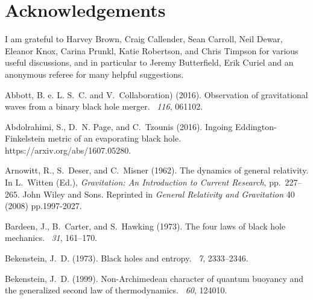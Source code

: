 \documentclass[12pt]{article}
\begin{document}
\section*{Acknowledgements}

I am grateful to Harvey Brown, Craig Callender, Sean Carroll, Neil Dewar, Eleanor Knox, Carina Prunkl, Katie Robertson, and Chris Timpson for various useful discussions, and in particular to Jeremy Butterfield, Erik Curiel and an anonymous referee for many helpful suggestions.


%
%

\begin{thebibliography}{}

\raggedright

Abbott, B. e. L. S.~C. and V.~Collaboration) (2016).
\newblock Observation of gravitational waves from a binary black hole merger.
~{\em 116}, 061102.

Abdolrahimi, S., D.~N. Page, and C.~Tzounis (2016).
\newblock Ingoing {E}ddington-{F}inkelstein metric of an evaporating black
  hole.
\newblock https://arxiv.org/abs/1607.05280.

Arnowitt, R., S.~Deser, and C.~Misner (1962).
\newblock The dynamics of general relativity.
\newblock In L.~Witten (Ed.), {\em Gravitation: An Introduction to Current
  Research}, pp.\  227--265. John Wiley and Sons.
\newblock Reprinted in \emph{General Relativity and Gravitation} 40 (2008)
  pp.1997-2027.

Bardeen, J., B.~Carter, and S.~Hawking (1973).
\newblock The four laws of black hole mechanics.
~{\em 31}, 161--170.

Bekenstein, J.~D. (1973).
\newblock Black holes and entropy.
~{\em 7}, 2333--2346.

Bekenstein, J.~D. (1999).
\newblock Non-{A}rchimedean character of quantum buoyancy and the generalized
  second law of thermodynamics.
~{\em 60}, 124010.


\end{thebibliography}
\end{document}
